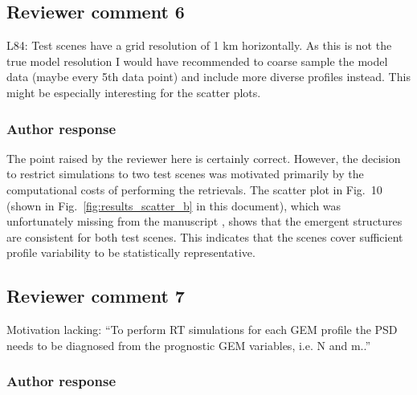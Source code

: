 %
%
%


\subsection*{Reviewer comment 6}

L84: Test scenes have a grid resolution of 1 km horizontally. As this is not the
true model resolution I would have recommended to coarse sample the model data
(maybe every 5th data point) and include more diverse profiles instead. This
might be especially interesting for the scatter plots.

\subsubsection*{Author response}

The point raised by the reviewer here is certainly correct. However, the
decision to restrict simulations to two test scenes was motivated primarily by
the computational costs of performing the retrievals. The scatter plot in
Fig.~10 (shown in Fig.~\ref{fig:results_scatter_b} in this document), which was
unfortunately missing from the manuscript , shows that the emergent structures
are consistent for both test scenes. This indicates that the scenes cover
sufficient profile variability to be statistically representative.

\subsection*{Reviewer comment 7}

Motivation lacking: “To perform RT simulations for each GEM profile the PSD
needs to be diagnosed from the prognostic GEM variables, i.e. N and m..”

\subsubsection*{Author response}

